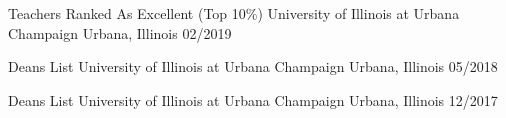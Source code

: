 \medskip
\begin{cvhonors}

\cvhonor
    {Teachers Ranked As Excellent (Top 10\%)} %
    {University of Illinois at Urbana Champaign} %
    {Urbana, Illinois} %
    {02/2019} %
    
\cvhonor
    {Deans List} %
    {University of Illinois at Urbana Champaign} %
    {Urbana, Illinois} %
    {05/2018} %
    
\cvhonor
    {Deans List} %
    {University of Illinois at Urbana Champaign} %
    {Urbana, Illinois} %
    {12/2017} %
\end{cvhonors}

